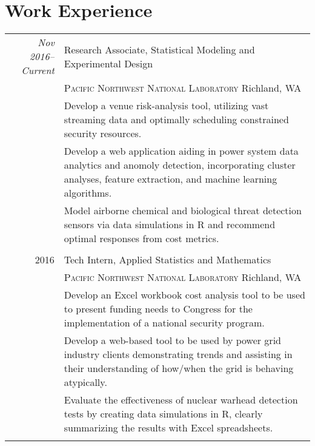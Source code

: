 \documentclass[a4paper,10pt]{article}
\begin{document}
\section{Work Experience}
\begin{tabular}{r|p{11cm}}
  \emph{Nov 2016--Current} & Research Associate, Statistical Modeling and Experimental Design \\
  & \textsc{Pacific Northwest National Laboratory} Richland, WA \\
  & \footnotesize{Develop a venue risk-analysis tool, utilizing vast streaming data and optimally scheduling constrained security resources.} \\
  & \footnotesize{Develop a web application aiding in power system data analytics and anomoly detection, incorporating cluster analyses, feature extraction, and machine learning algorithms.} \\
  & \footnotesize{Model airborne chemical and biological threat detection sensors via data simulations in R and recommend optimal responses from cost metrics.} \\ \multicolumn{2}{c}{} \\
  
  \textsc{2016} & Tech Intern, Applied Statistics and Mathematics \\
  & \textsc{Pacific Northwest National Laboratory} Richland, WA \\
  & \footnotesize{Develop an Excel workbook cost analysis tool to be used to present funding needs to Congress for the implementation of a national security program.} \\
  & \footnotesize{Develop a web-based tool to be used by power grid industry clients demonstrating trends and assisting in their understanding of how/when the grid is behaving atypically.} \\
  & \footnotesize{Evaluate the effectiveness of nuclear warhead detection tests by creating data simulations in R, clearly summarizing the results with Excel spreadsheets.} \\ \multicolumn{2}{c}{} \\
  
\end{tabular}
\end{document}
